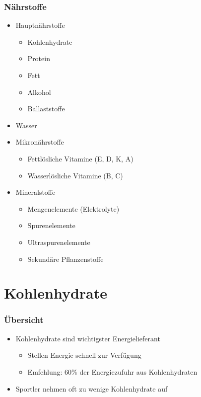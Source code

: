 \documentclass[ngerman, aspectratio=169]{beamer}
\begin{document}
\begin{frame}
  \frametitle{Nährstoffe}
  \begin{multicols}{2}
    \begin{itemize}
      
    \item<+-> Hauptnährstoffe
      \begin{itemize}
      \item Kohlenhydrate
      \item Protein
      \item Fett
      \item Alkohol
      \item Ballaststoffe
      \end{itemize}
      
    \item<+-> Wasser
      
      \vfill\null
      \columnbreak
      
    \item<+-> Mikronährstoffe
      \begin{itemize}
      \item Fettlösliche Vitamine (E, D, K, A)
      \item Wasserlösliche Vitamine (B, C)
      \end{itemize}
      
    \item<+-> Mineralstoffe
      \begin{itemize}
      \item Mengenelemente (Elektrolyte)
      \item Spurenelemente
      \item Ultraspurenelemente
      \item Sekundäre Pflanzenstoffe
      \end{itemize}

    \end{itemize}
    
  \end{multicols}
  
\end{frame}

\section{Kohlenhydrate}
\begin{frame}
  \frametitle{Übersicht}
  \begin{itemize}
  \item Kohlenhydrate sind wichtigster Energielieferant
    \begin{itemize}
    \item Stellen Energie schnell zur Verfügung
    \item Emfehlung: 60\% der Energiezufuhr aus Kohlenhydraten
    \end{itemize}

  \item Sportler nehmen oft zu wenige Kohlenhydrate auf
  \end{itemize}
\end{frame}
\end{document}
